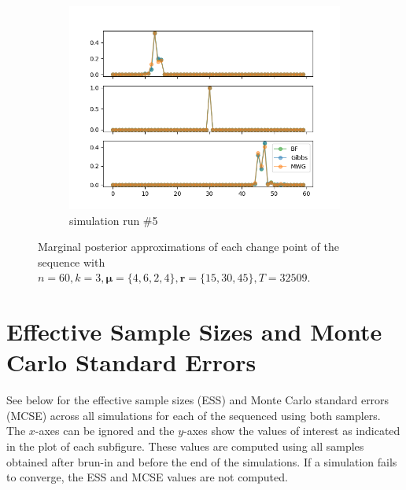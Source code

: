 \begin{figure}[H]
\begin{subfigure}{.3\textwidth}
    	\includegraphics[width=\linewidth]{../../plots/Posterior_post_burnin_M4_N60_NMCMC3_seed4_diffind2.png}
    	\caption{simulation run \#5}
	\end{subfigure}
	\caption{Marginal posterior approximations of each change point of the sequence with $n=60, k=3, \bm{\mu}=\{4,6,2,4\}, \bm{r}=\{15,30,45\}, T=32509$.}
\end{figure}

\section{Effective Sample Sizes and Monte Carlo Standard Errors}\label{appendix:ess_se}

See below for the effective sample sizes (ESS) and Monte Carlo standard errors (MCSE) across all simulations for each of the sequenced using both samplers. The $x$-axes can be ignored and the $y$-axes show the values of interest as indicated in the plot of each subfigure. These values are computed using all samples obtained after brun-in and before the end of the simulations. If a simulation fails to converge, the ESS and MCSE values are not computed.


